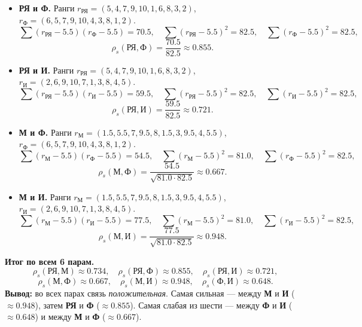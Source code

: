 \documentclass[12pt,a4paper]{article}
\begin{document}
\begin{enumerate}[label=\textbf{\arabic*.}]
\begin{itemize}
\item \textbf{РЯ и Ф.} Ранги $r_{\text{РЯ}}=(5,4,7,9,10,1,6,8,3,2)$, $r_{\text{Ф}}=(6,5,7,9,10,4,3,8,1,2)$.
\[
\sum (r_{\text{РЯ}}-5.5)(r_{\text{Ф}}-5.5)=70.5,\quad
\sum (r_{\text{РЯ}}-5.5)^2=82.5,\quad
\sum (r_{\text{Ф}}-5.5)^2=82.5,
\]
\[
\rho_s(\text{РЯ},\text{Ф})=\frac{70.5}{82.5}\approx 0.855.
\]
\item \textbf{РЯ и И.} Ранги $r_{\text{РЯ}}=(5,4,7,9,10,1,6,8,3,2)$, $r_{\text{И}}=(2,6,9,10,7,1,3,8,4,5)$.
\[
\sum (r_{\text{РЯ}}-5.5)(r_{\text{И}}-5.5)=59.5,\quad
\sum (r_{\text{РЯ}}-5.5)^2=82.5,\quad
\sum (r_{\text{И}}-5.5)^2=82.5,
\]
\[
\rho_s(\text{РЯ},\text{И})=\frac{59.5}{82.5}\approx 0.721.
\]
\item \textbf{М и Ф.} Ранги $r_{\text{М}}=(1.5,5.5,7,9.5,8,1.5,3,9.5,4,5.5)$, $r_{\text{Ф}}=(6,5,7,9,10,4,3,8,1,2)$.
\[
\sum (r_{\text{М}}-5.5)(r_{\text{Ф}}-5.5)=54.5,\quad
\sum (r_{\text{М}}-5.5)^2=81.0,\quad
\sum (r_{\text{Ф}}-5.5)^2=82.5,
\]
\[
\rho_s(\text{М},\text{Ф})=\frac{54.5}{\sqrt{81.0\cdot 82.5}}\approx 0.667.
\]
\item \textbf{М и И.} Ранги $r_{\text{М}}=(1.5,5.5,7,9.5,8,1.5,3,9.5,4,5.5)$, $r_{\text{И}}=(2,6,9,10,7,1,3,8,4,5)$.
\[
\sum (r_{\text{М}}-5.5)(r_{\text{И}}-5.5)=77.5,\quad
\sum (r_{\text{М}}-5.5)^2=81.0,\quad
\sum (r_{\text{И}}-5.5)^2=82.5,
\]
\[
\rho_s(\text{М},\text{И})=\frac{77.5}{\sqrt{81.0\cdot 82.5}}\approx 0.948.
\]
\end{itemize}

\textbf{Итог по всем 6 парам.}
\[
\rho_s(\text{РЯ},\text{М})\approx 0.734,\quad
\rho_s(\text{РЯ},\text{Ф})\approx 0.855,\quad
\rho_s(\text{РЯ},\text{И})\approx 0.721,
\]
\[
\rho_s(\text{М},\text{Ф})\approx 0.667,\quad
\rho_s(\text{М},\text{И})\approx 0.948,\quad
\rho_s(\text{Ф},\text{И})\approx 0.648.
\]
\textbf{Вывод:} во всех парах связь \emph{положительная}. Самая сильная — между \textbf{М} и \textbf{И} ($\approx 0.948$), затем \textbf{РЯ} и \textbf{Ф} ($\approx 0.855$). Самая слабая из шести — между \textbf{Ф} и \textbf{И} ($\approx 0.648$) и между \textbf{М} и \textbf{Ф} ($\approx 0.667$).

\end{enumerate}
\end{document}

